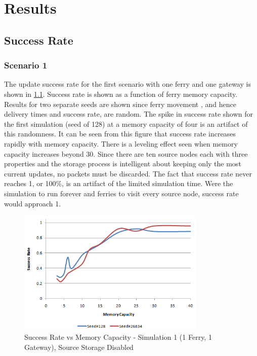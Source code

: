 \chapter{Results}

\section{Success Rate}

\subsection{Scenario 1}
\label{sec:results_success_scenario1}

The update success rate for the first scenario with one ferry and one gateway is shown in \ref{fig:result_sccess_sim1byseed_dss}.
Success rate is shown as a function of ferry memory capacity. 
Results for two separate seeds are shown since ferry movement , and hence delivery times and success rate, are random.
The spike in success rate shown for the first simulation (seed of 128) at a memory capacity of four is an artifact of this randomness.
It can be seen from this figure that success rate increases rapidly with memory capacity.
There is a leveling effect seen when memory capacity increases beyond 30.
Since there are ten source nodes each with three properties and the storage process is intelligent about keeping only the most current updates, no packets must be discarded.
The fact that success rate never reaches 1, or 100\%, is an artifact of the limited simulation time.
Were the simulation to run forever and ferries to visit every source node, success rate would approach 1.

\begin{figure}[htbp]
    \begin{center}
    \includegraphics[width=0.8\textwidth]{images/result_sccess_sim1byseed_dss}
    \caption{Success Rate vs Memory Capacity - Simulation 1 (1 Ferry, 1 Gateway), Source Storage Disabled}
    \label{fig:result_sccess_sim1byseed_dss}
    \end{center}
\end{figure}

